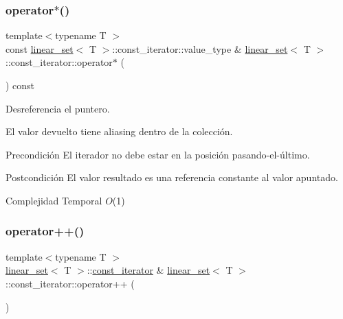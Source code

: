 \subsubsection{\texorpdfstring{operator$\ast$()}{operator*()}}
{\footnotesize\ttfamily template$<$typename T $>$ \\
const \mbox{\hyperlink{classlinear__set}{linear\+\_\+set}}$<$ T $>$\+::const\+\_\+iterator\+::value\+\_\+type \& \mbox{\hyperlink{classlinear__set}{linear\+\_\+set}}$<$ T $>$\+::const\+\_\+iterator\+::operator$\ast$ (\begin{DoxyParamCaption}{ }\end{DoxyParamCaption}) const}



Desreferencia el puntero. 

El valor devuelto tiene aliasing dentro de la colección.

\begin{DoxyPrecond}{Precondición}
El iterador no debe estar en la posición pasando-\/el-\/último. 
\end{DoxyPrecond}
\begin{DoxyPostcond}{Postcondición}
El valor resultado es una referencia constante al valor apuntado.
\end{DoxyPostcond}

\begin{DoxyDescription}
\item[Complejidad Temporal]$O$(1)
\end{DoxyDescription}\mbox{\label{classlinear__set_1_1const__iterator_aae244f473a6bc213fb9cd16d5caf8b08}} 
\subsubsection{\texorpdfstring{operator++()}{operator++()}}
{\footnotesize\ttfamily template$<$typename T $>$ \\
\mbox{\hyperlink{classlinear__set}{linear\+\_\+set}}$<$ T $>$\+::\mbox{\hyperlink{classlinear__set_1_1const__iterator}{const\+\_\+iterator}} \& \mbox{\hyperlink{classlinear__set}{linear\+\_\+set}}$<$ T $>$\+::const\+\_\+iterator\+::operator++ (\begin{DoxyParamCaption}{ }\end{DoxyParamCaption})}



